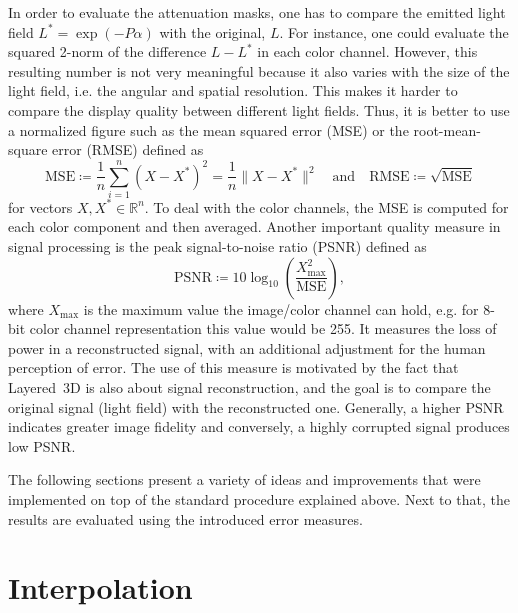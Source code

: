 In order to evaluate the attenuation masks, one has to compare the emitted light field $L^\ast = \exp(- P \alpha)$ with the original, $L$.
For instance, one could evaluate the squared 2-norm of the difference $L - L^\ast$ in each color channel.
However, this resulting number is not very meaningful because it also varies with the size of the light field, i.e. the angular and spatial resolution.
This makes it harder to compare the display quality between different light fields.
Thus, it is better to use a normalized figure such as the mean squared error \mbox{(MSE)} or the root-mean-square error \mbox{(RMSE)} defined as
\begin{equation*}
	\text{MSE} \coloneqq \frac{1}{n} \sum_{i = 1}^{n} (X - X^\ast)^2 = \frac{1}{n} \lVert X - X^\ast \rVert^2
	\quad \text{and} \quad
	\text{RMSE} \coloneqq \sqrt{\text{MSE}}
\end{equation*}
for vectors $X, X^\ast \in \mathbb{R}^n$.
To deal with the color channels, the \mbox{MSE} is computed for each color component and then averaged.
Another important quality measure in signal processing is the peak signal-to-noise ratio \mbox{(PSNR)} defined as
\begin{equation*}
	\text{PSNR} \coloneqq 10 \log_{10} \left(\frac{X_\text{max}^2}{\text{MSE}}\right),
\end{equation*}
where $X_\text{max}$ is the maximum value the image/color channel can hold, e.g. for 8-bit color channel representation this value would be 255.
It measures the loss of power in a reconstructed signal, with an additional adjustment for the human perception of error.
The use of this measure is motivated by the fact that \mbox{Layered 3D} is also about signal reconstruction, and the goal is to compare the original signal (light field) with the reconstructed one. 
Generally, a higher \mbox{PSNR} indicates greater image fidelity and conversely, a highly corrupted signal produces low \mbox{PSNR}.

The following sections present a variety of ideas and improvements that were implemented on top of the standard procedure explained above.
Next to that, the results are evaluated using the introduced error measures.

\section{Interpolation}
\label{sec:interpolation}

